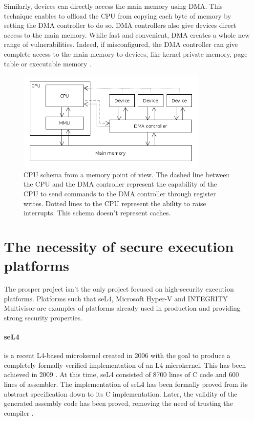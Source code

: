 \documentclass{kththesis}
\begin{document}
Similarly, devices can directly access the main memory using DMA. This technique enables to offload the CPU from copying each byte of memory by setting the DMA controller to do so. DMA controllers also give devices direct access to the main memory. While fast and convenient, DMA creates a whole new range of vulnerabilities. Indeed, if misconfigured, the DMA controller can give complete access to the main memory to devices, like kernel private memory, page table or executable memory \cite{schwarz_formal_2014}.

\begin{figure}[!t]
	\includegraphics[height=5cm]{figures/cpu-memory-schema.png}
	\centering
	\caption{CPU schema from a memory point of view. The dashed line between the CPU and the DMA controller represent the capability of the CPU to send commands to the DMA controller through register writes. Dotted lines to the CPU represent the ability to raise interrupts. This schema doesn't represent caches.}
	\label{cpu-memory-schema}
\end{figure}

\section{The necessity of secure execution platforms}

The \acrshort{prosper} project isn't the only project focused on high-security execution platforms. Platforms such that seL4, Microsoft Hyper-V and INTEGRITY Multivisor are examples of platforms already used in production and providing strong security properties.

\paragraph{seL4} is a recent L4-based microkernel created in 2006 with the goal to produce a completely formally verified implementation of an L4 microkernel. This has been achieved in 2009 \cite{klein_sel4:_2009}. At this time, seL4 consisted of \num{8700} lines of C code and \num{600} lines of assembler. The implementation of seL4 has been formally proved from its abstract specification down to its C implementation. Later, the validity of the generated assembly code has been proved, removing the need of trusting the compiler \cite{noauthor_what_nodate}.
\end{document}
